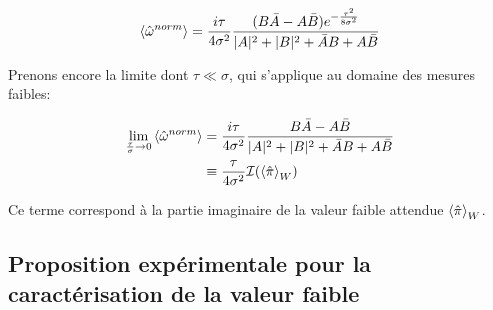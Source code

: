 \begin{onehalfspace}
    \begin{equation}
        \expval{\hat{\omega}^{norm}} = \frac{i\tau}{4\sigma^2}\frac{(B\bar{A} - A\bar{B})e^{-\frac{\tau^2}{8\sigma^2}}}{|A|^2 + |B|^2 + \bar{A}B + A\bar{B}}
    \end{equation}

    \noindent Prenons encore la limite dont $\tau \ll \sigma$, qui 
    s’applique au domaine des mesures faibles:

    \begin{align}
        \lim_{\frac{\tau}{\sigma} \to 0}\expval{\hat{\omega}^{norm}} &= \frac{i\tau}{4\sigma^2}\frac{B\bar{A} - A\bar{B}}{|A|^2 + |B|^2 + \bar{A}B + A\bar{B}}\\
        &\equiv \frac{\tau}{4\sigma^2}\mathcal{I}(\expval{\hat{\pi}}_W)
        \label{eq:imaginary_part}
    \end{align}

    \noindent Ce terme correspond à la partie imaginaire de la valeur 
    faible attendue $\expval{\hat{\pi}}_W$.

\end{onehalfspace}

\subsection{Proposition expérimentale pour la caractérisation de la valeur faible}\label{sec:proposition_exp}
    
